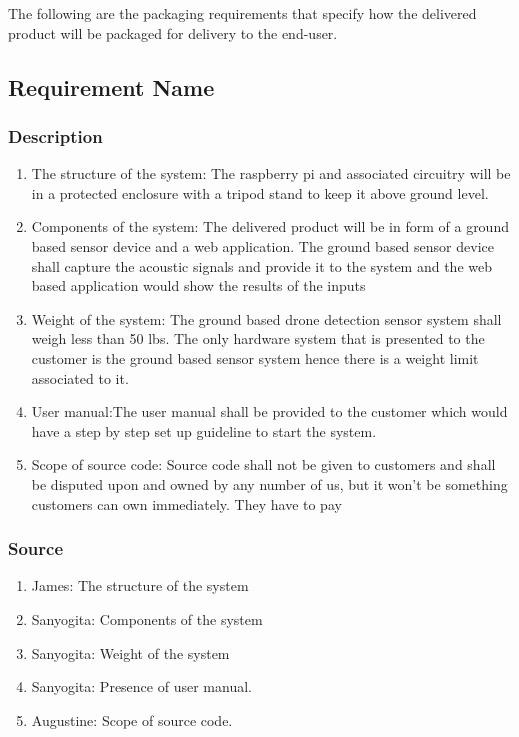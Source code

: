 The following are the packaging requirements that specify how the delivered product will be packaged for delivery to the end-user.

\subsection{Requirement Name}
\subsubsection{Description}
\begin{enumerate}
  \item	The structure of the system: The raspberry pi and associated circuitry will be in a protected enclosure with a tripod stand to keep it above ground level.
  \item Components of the system: The delivered product will be in form of a ground based sensor device and a web application. The ground based sensor device shall capture the acoustic signals and provide it to the system and the web based application would show the results of the inputs
  \item Weight of the system: The ground based drone detection sensor system shall weigh less than 50 lbs. The only hardware system that is presented to the customer is the ground based sensor system hence there is a weight limit associated to it.
  \item User manual:The user manual shall be provided to the customer which would have a step by step set up guideline to start the system.
 \item Scope of source code: Source code shall not be given to customers	and shall be disputed upon and owned by any number of us, but it won't be something customers can own immediately. They have to pay



\end{enumerate}
\subsubsection{Source}
\begin{enumerate}
  \item James: The structure of the system
  \item Sanyogita: Components of the system
  \item Sanyogita: Weight of the system
  \item Sanyogita: Presence of user manual.
  \item Augustine: Scope of source code.
\end{enumerate}
